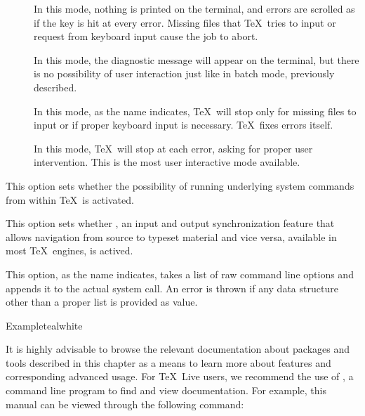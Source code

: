 \begin{description}
\begin{description}
\begin{description}
\item[] In this mode, nothing is printed on the terminal, and errors are scrolled as if the  key is hit at every error. Missing files that \TeX\ tries to input or request from keyboard input cause the job to abort.

\item[] In this mode, the diagnostic message will appear on the terminal, but there is no possibility of user interaction just like in batch mode, previously described.

\item[] In this mode, as the name indicates, \TeX\ will stop only for missing files to input or if proper keyboard input is necessary. \TeX\ fixes errors itself.

\item[] In this mode, \TeX\ will stop at each error, asking for proper user intervention. This is the most user interactive mode available.
\end{description}

\item[\rpsbox{shell}] This option sets whether the possibility of running underlying system commands from within \TeX\ is activated.

\item[\rpsbox{synctex}] This option sets whether , an input and output synchronization feature that allows navigation from source to typeset material and vice versa, available in most \TeX\ engines, is actived.

\item[\abox{options}] This option, as the name indicates, takes a list of raw command line options and appends it to the actual system call. An error is thrown if any data structure other than a proper list is provided as value.
\end{description}

\begin{codebox}{Example}{teal}{\icnote}{white}
\end{codebox}

\end{description}

It is highly advisable to browse the relevant documentation about packages and tools described in this chapter as a means to learn more about features and corresponding advanced usage. For \TeX\ Live users, we recommend the use of , a command line program to find and view documentation. For example, this manual can be viewed through the following command:

